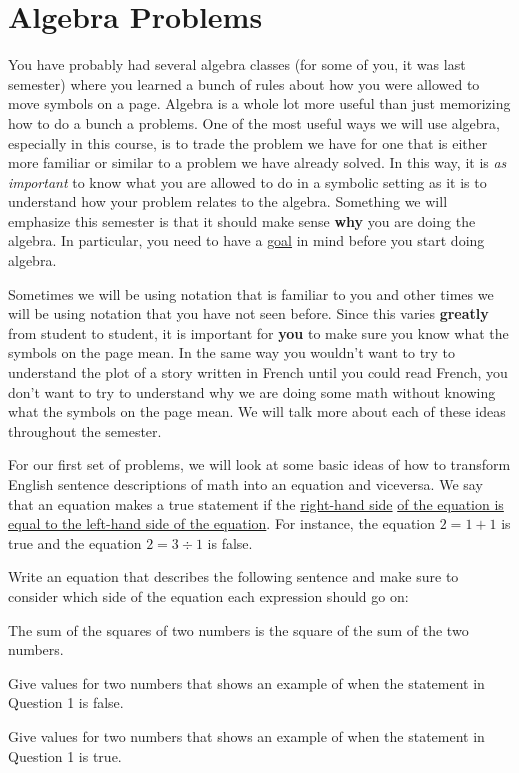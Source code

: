 \section{Algebra Problems}
You have probably had several algebra classes (for some of you, it was last semester) where you learned a bunch of rules about how you were allowed to move symbols on a page. Algebra is a whole lot more useful than just memorizing how to do a bunch a problems. One of the most useful ways we will use algebra, especially in this course, is to trade the problem we have for one that is either more familiar or similar to a problem we have already solved. In this way, it is \emph{as important} to know what you are allowed to do in a symbolic setting as it is to understand how your problem relates to the algebra. Something we will emphasize this semester is that it should make sense \textbf{why} you are doing the algebra. In particular, you need to have a \underline{goal} in mind before you start doing algebra.

Sometimes we will be using notation that is familiar to you and other times we will be using notation that you have not seen before. Since this varies \textbf{greatly} from student to student, it is important for \textbf{you} to make sure you know what the symbols on the page mean. In the same way you wouldn't want to try to understand the plot of a story written in French until you could read French, you don't want to try to understand why we are doing some math without knowing what the symbols on the page mean. We will talk more about each of these ideas throughout the semester.


For our first set of problems, we will look at some basic ideas of how to transform English sentence descriptions of math into an equation and viceversa. We say that an equation makes a true statement if the \underline{right-hand side} \underline{of the equation is equal to the left-hand side of the equation}. For instance, the equation $2=1+1$ is true and the equation $2=3 \div 1$ is false.

\bq Write an equation that describes the following sentence and make sure to consider which side of the equation each expression should go on:

The sum of the squares of two numbers is the square of the sum of the two numbers.

\eq

\bq \be
\item Give values for two numbers that shows an example of when the statement in Question 1 is false.
\item Give values for two numbers that shows an example of when the statement in Question 1 is true.
\ee \eq

